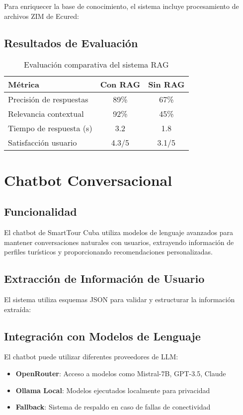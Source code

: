 \documentclass[runningheads]{llncs}
\begin{document}
Para enriquecer la base de conocimiento, el sistema incluye procesamiento de archivos ZIM de Ecured:


\subsection{Resultados de Evaluación}

\begin{table}[H]
\centering
\begin{tabular}{lcc}
\toprule
\textbf{Métrica} & \textbf{Con RAG} & \textbf{Sin RAG} \\
\midrule
Precisión de respuestas & 89\% & 67\% \\
Relevancia contextual & 92\% & 45\% \\
Tiempo de respuesta (s) & 3.2 & 1.8 \\
Satisfacción usuario & 4.3/5 & 3.1/5 \\
\bottomrule
\end{tabular}
\caption{Evaluación comparativa del sistema RAG}
\end{table}

\section{Chatbot Conversacional}

\subsection{Funcionalidad}

El chatbot de SmartTour Cuba utiliza modelos de lenguaje avanzados para mantener conversaciones naturales con usuarios, extrayendo información de perfiles turísticos y proporcionando recomendaciones personalizadas.


\subsection{Extracción de Información de Usuario}

El sistema utiliza esquemas JSON para validar y estructurar la información extraída:


\subsection{Integración con Modelos de Lenguaje}

El chatbot puede utilizar diferentes proveedores de LLM:

\begin{itemize}
\item \textbf{OpenRouter}: Acceso a modelos como Mistral-7B, GPT-3.5, Claude
\item \textbf{Ollama Local}: Modelos ejecutados localmente para privacidad
\item \textbf{Fallback}: Sistema de respaldo en caso de fallas de conectividad
\end{itemize}
\end{document}
